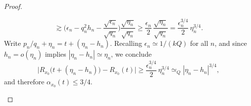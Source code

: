 \documentclass[10pt,a4paper]{amsart}
\begin{document}
\begin{proof}
\begin{itemize}
\begin{itemize}
\begin{equation}
	\gtrsim \Big( \epsilon_n - q_n^2 h_n - \frac{\sqrt{\epsilon_n}}{ \sqrt{q_n} } \Big) \frac{\sqrt{\eta_n}}{\sqrt{q_n}}
	\geq \frac{\epsilon_n}{2} \, \frac{\sqrt{\eta_n}}{\sqrt{q_n}}
	=  \frac{\epsilon_n^{3/4}}{2} \, \eta_n^{3/4}.
	\end{equation}
	Write $p_n/q_n + \eta_n = t + (\eta_n - h_n)$. 
	Recalling $\epsilon_n \simeq 1/(kQ)$ for all $n$, and since $h_n = o(\eta_n)$ implies $|\eta_n - h_n| \simeq \eta_n$,  we conclude
	\begin{equation}
	\Big|  R_{x_0}\Big( t + (\eta_n - h_n) \Big) -R_{x_0}(t) \Big|
	\geq  \frac{\epsilon_n^{3/4}}{2} \, \eta_n^{3/4}
	\simeq_Q |\eta_n - h_n|^{3/4}, 
	\end{equation}
	and therefore $\alpha_{x_0}(t) \leq 3/4$. 
\end{itemize}

\end{itemize}
\end{proof}
\end{document}
